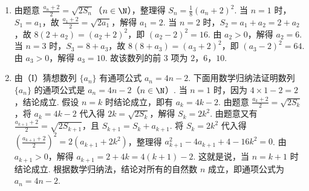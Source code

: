 \begin{solution}
\begin{enumerate}
\item 由题意 \(\frac{a_n + 2}{2} = \sqrt{2S_n}\)（\(n \in \N\)），整理得 \(S_n = \frac{1}{8}\left(a_n + 2\right)^2\). 当 \(n = 1\) 时，\(S_1 = a_1\)，故 \(\frac{a_1 + 2}{2} = \sqrt{2a_1}\)，解得 \(a_1 = 2\). 当 \(n = 2\) 时，\(S_2 = a_1 + a_2 = 2 + a_2\)，故 \(8(2 + a_2) = \left(a_2 + 2\right)^2\)，即 \(\left(a_2 - 2\right)^2 = 16\). 由 \(a_2 > 0\)，解得 \(a_2 = 6\). 当 \(n = 3\) 时，\(S_3 = 8 + a_3\)，故 \(8(8 + a_3) = \left(a_3 + 2\right)^2\)，即 \(\left(a_3 - 2\right)^2 = 64\). 由 \(a_3 > 0\)，解得 \(a_3 = 10\). 故该数列的前 \(3\) 项为 \(2\)，\(6\)，\(10\).
\item 由（I）猜想数列 \(\{a_n\}\) 有通项公式 \(a_n = 4n - 2\). 下面用数学归纳法证明数列 \(\{a_n\}\) 的通项公式是 \(a_n = 4n - 2\)（\(n \in \N\)）. 当 \(n = 1\) 时，因为 \(4 \times 1 - 2 = 2\)，结论成立. 假设 \(n = k\) 时结论成立，即有 \(a_k = 4k - 2\). 由题意 \(\frac{a_k + 2}{2} = \sqrt{2S_k}\)，将 \(a_k = 4k - 2\) 代入得 \(2k = \sqrt{2S_k}\)，解得 \(S_k = 2k^2\). 由题意又有 \(\frac{a_{k+1} + 2}{2} = \sqrt{2S_{k+1}}\)，且 \(S_{k+1} = S_k + a_{k+1}\). 将 \(S_k = 2k^2\) 代入得 \(\left(\frac{a_{k+1} + 2}{2}\right)^2 = 2\left(a_{k+1} + 2k^2\right)\)，整理得 \(a_{k+1}^2 - 4a_{k+1} + 4 - 16k^2 = 0\). 由 \(a_{k+1} > 0\)，解得 \(a_{k+1} = 2 + 4k = 4(k + 1) - 2\). 这就是说，当 \(n = k + 1\) 时结论成立. 根据数学归纳法，结论对所有的自然数 \(n\) 成立，即通项公式为 \(a_n = 4n - 2\).
\end{enumerate}
\end{solution}
